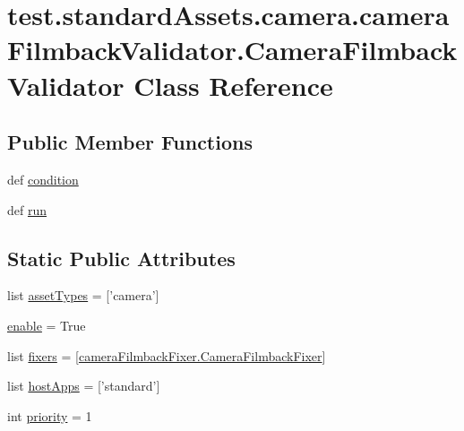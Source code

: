 \hypertarget{classtest_1_1standardAssets_1_1camera_1_1cameraFilmbackValidator_1_1CameraFilmbackValidator}{\section{test.\-standard\-Assets.\-camera.\-camera\-Filmback\-Validator.\-Camera\-Filmback\-Validator \-Class \-Reference}
\label{d6/dc3/classtest_1_1standardAssets_1_1camera_1_1cameraFilmbackValidator_1_1CameraFilmbackValidator}
}
\subsection*{\-Public \-Member \-Functions}
\begin{DoxyCompactItemize}
\item 
def \hyperlink{classtest_1_1standardAssets_1_1camera_1_1cameraFilmbackValidator_1_1CameraFilmbackValidator_a7418be1e5f2cd579d09f2c4e9f1de345}{condition}
\item 
def \hyperlink{classtest_1_1standardAssets_1_1camera_1_1cameraFilmbackValidator_1_1CameraFilmbackValidator_acf4f66b3e652a529803a9c413c37dab9}{run}
\end{DoxyCompactItemize}
\subsection*{\-Static \-Public \-Attributes}
\begin{DoxyCompactItemize}
\item 
list \hyperlink{classtest_1_1standardAssets_1_1camera_1_1cameraFilmbackValidator_1_1CameraFilmbackValidator_ac80b9222416fefe3b76857b4f71a9a71}{asset\-Types} = \mbox{[}'camera'\mbox{]}
\item 
\hyperlink{classtest_1_1standardAssets_1_1camera_1_1cameraFilmbackValidator_1_1CameraFilmbackValidator_a85ed5f94980201871468d41741a757d6}{enable} = \-True
\item 
list \hyperlink{classtest_1_1standardAssets_1_1camera_1_1cameraFilmbackValidator_1_1CameraFilmbackValidator_a0e0d5873202debbd3cb48851afb37e31}{fixers} = \mbox{[}\hyperlink{classtest_1_1standardAssets_1_1camera_1_1cameraFilmbackFixer_1_1CameraFilmbackFixer}{camera\-Filmback\-Fixer.\-Camera\-Filmback\-Fixer}\mbox{]}
\item 
list \hyperlink{classtest_1_1standardAssets_1_1camera_1_1cameraFilmbackValidator_1_1CameraFilmbackValidator_af5f83d4e9dcb767ee625bef40a92b252}{host\-Apps} = \mbox{[}'standard'\mbox{]}
\item 
int \hyperlink{classtest_1_1standardAssets_1_1camera_1_1cameraFilmbackValidator_1_1CameraFilmbackValidator_aa6b13b798257a225212122c07d14dfcf}{priority} = 1
\end{DoxyCompactItemize}


